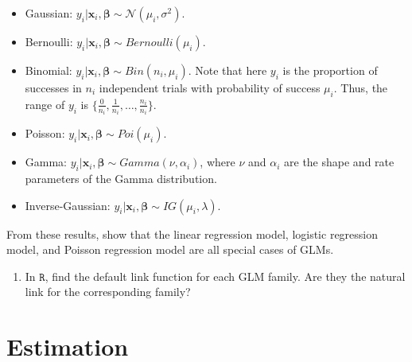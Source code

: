 \documentclass[
  12pt,
]{book}
\providecommand{\tightlist}{%
  \setlength{\itemsep}{0pt}\setlength{\parskip}{0pt}}
\newcommand{\pr}[2][]{P_{#1}\left(#2\right)}
\newcommand{\spac}[1]{\mathcal{#1}}
\def \given {|}
\newcommand{\knowledge}{K}
\newcommand{\know}{\knowledge}
\newcommand{\e}[1]{{\textrm E}[#1]}
\newcommand{\var}[1]{{\textrm{Var}}[#1]}
\newcommand{\cov}[2]{{\textrm{Cov}}[#1,#2]}
\newcommand{\real}{{\mathbb R}}
\newcommand{\set}[1]{\{#1\}}
\newcommand{\st}{:\,}
\newcommand{\normal}{{\mathcal N}}
\newcommand{\natnos}{\mathbb{N}}
\newcommand{\hbeta}{\hat{\beta}}
\newcommand{\isp}{\;}
\newcommand{\mc}{\mathcal}
\newcommand{\mb}[1]{\boldsymbol{#1}}
\begin{document}
\begin{itemize}
\item
  Gaussian: \(y_i |\boldsymbol{x}_i, \boldsymbol{\beta} \sim \mathcal{N}(\mu_i, \sigma^2)\).
\item
  Bernoulli: \(y_i |\boldsymbol{x}_i, \boldsymbol{\beta} \sim Bernoulli(\mu_i)\).
\item
  Binomial: \(y_i |\boldsymbol{x}_i, \boldsymbol{\beta} \sim Bin(n_i, \mu_i)\). Note that here \(y_i\) is the proportion of successes in \(n_i\) independent trials with probability of success \(\mu_i\). Thus, the range of \(y_i\) is \(\{ \frac{0}{n_i}, \frac{1}{n_i}, \ldots, \frac{n_i}{n_i} \}\).
\item
  Poisson: \(y_i |\boldsymbol{x}_i, \boldsymbol{\beta} \sim Poi(\mu_i)\).
\item
  Gamma: \(y_i |\boldsymbol{x}_i, \boldsymbol{\beta} \sim Gamma(\nu, \alpha_i)\), where \(\nu\) and \(\alpha_i\) are the shape and rate parameters of the Gamma distribution.
\item
  Inverse-Gaussian: \(y_i |\boldsymbol{x}_i, \boldsymbol{\beta} \sim IG(\mu_i, \lambda)\).
\end{itemize}

From these results, show that the linear regression model, logistic regression model, and Poisson regression model are all special cases of GLMs.

\begin{enumerate}
\def\labelenumi{\arabic{enumi}.}
\setcounter{enumi}{3}
\tightlist
\item
  In \(\texttt{R}\), find the default link function for each GLM family. Are they the natural link for the corresponding family?
\end{enumerate}

\chapter{Estimation}\label{estimation}

\renewcommand{\pr}[2][]{P_{#1}\left(#2\right)}
\renewcommand{\spac}[1]{\mathcal{#1}}
\renewcommand{\given}{|}
\renewcommand{\knowledge}{K}
\renewcommand{\know}{\knowledge}
\renewcommand{\e}[1]{{\mathrm E}[#1]}
\renewcommand{\var}[1]{{\mathrm{Var}}[#1]}
\renewcommand{\cov}[1]{{\mathrm{Cov}}[#1]}
\renewcommand{\real}{{\mathbb R}}
\renewcommand{\set}[1]{\left\{#1\right\}}
\renewcommand{\st}{:\,}
\renewcommand{\normal}{{\mathcal N}}
\renewcommand{\natnos}{\mathbb{N}}
\renewcommand{\isp}{\;}
\renewcommand{\mc}{\mathcal}
\renewcommand{\hbeta}{\hat{\mb{\beta}}}
\renewcommand{\mb}[1]{\boldsymbol{#1}}
\end{document}
